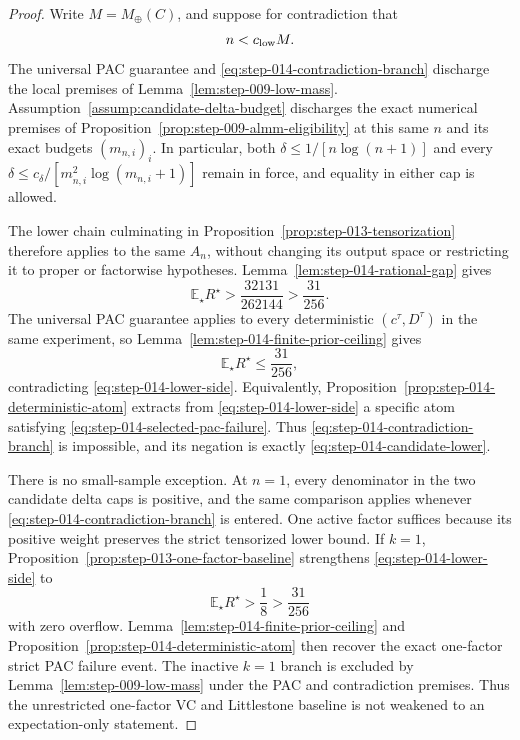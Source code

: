 \begin{proof}
Write \(M=M_{\oplus}(C)\), and suppose for contradiction that
\begin{equation}\label{eq:step-014-contradiction-branch}
n<c_{\rm low}M.
\end{equation}
The universal PAC guarantee and
\eqref{eq:step-014-contradiction-branch} discharge the local premises
of Lemma~\ref{lem:step-009-low-mass}.
Assumption~\ref{assump:candidate-delta-budget} discharges the exact
numerical premises of
Proposition~\ref{prop:step-009-almm-eligibility} at this same \(n\) and
its exact budgets \((m_{n,i})_i\).  In particular, both
\(\delta\le1/[n\log(n+1)]\) and every
\(\delta\le c_\delta/[m_{n,i}^2\log(m_{n,i}+1)]\) remain in force, and
equality in either cap is allowed.

The lower chain culminating in
Proposition~\ref{prop:step-013-tensorization} therefore applies to the
same \(A_n\), without changing its output space or restricting it to
proper or factorwise hypotheses.  Lemma~\ref{lem:step-014-rational-gap}
gives
\begin{equation}\label{eq:step-014-lower-side}
\mathbb E_\star R^\star
>\frac{32131}{262144}
>\frac{31}{256}.
\end{equation}
The universal PAC guarantee applies to every deterministic
\((c^\tau,D^\tau)\) in the same experiment, so
Lemma~\ref{lem:step-014-finite-prior-ceiling} gives
\begin{equation}\label{eq:step-014-upper-side}
\mathbb E_\star R^\star\le\frac{31}{256},
\end{equation}
contradicting \eqref{eq:step-014-lower-side}.  Equivalently,
Proposition~\ref{prop:step-014-deterministic-atom} extracts from
\eqref{eq:step-014-lower-side} a specific atom satisfying
\eqref{eq:step-014-selected-pac-failure}.  Thus
\eqref{eq:step-014-contradiction-branch} is impossible, and its
negation is exactly \eqref{eq:step-014-candidate-lower}.

There is no small-sample exception.  At \(n=1\), every denominator in
the two candidate delta caps is positive, and the same comparison
applies whenever \eqref{eq:step-014-contradiction-branch} is entered.
One active factor suffices because its positive weight preserves the
strict tensorized lower bound.  If \(k=1\),
Proposition~\ref{prop:step-013-one-factor-baseline} strengthens
\eqref{eq:step-014-lower-side} to
\begin{equation}\label{eq:step-014-one-factor-gap}
\mathbb E_\star R^\star>\frac18>\frac{31}{256}
\end{equation}
with zero overflow.  Lemma~\ref{lem:step-014-finite-prior-ceiling} and
Proposition~\ref{prop:step-014-deterministic-atom} then recover the
exact one-factor strict PAC failure event.  The inactive \(k=1\) branch
is excluded by Lemma~\ref{lem:step-009-low-mass} under the PAC and
contradiction premises.  Thus the unrestricted one-factor VC and
Littlestone baseline is not weakened to an expectation-only statement.
\end{proof}

